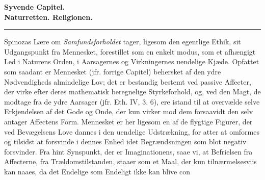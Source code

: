 \documentclass[12pt,a4paper]{book}
\begin{document}
\begin{center}
{\large\textbf{Syvende Capitel.}}\\[4pt]
\textbf{Naturretten. Religionen.}\\[6pt]
\rule{2cm}{0.4pt}
\end{center}
\bigskip
Spinozas Lære om \emph{Samfundsforholdet} tager, ligesom den egentlige Ethik, sit Udgangspunkt fra Mennesket, forestillet som en enkelt modus, som et afhængigt Led i Naturens Orden, i Aarsagernes og Virkningernes uendelige Kjæde. Opfattet som saadant er Mennesket (jfr. forrige Capitel) behersket af den ydre Nødvendigheds almindelige Lov; det er bestandig bestemt ved passive Affecter, der virke efter deres mathematisk beregnelige Styrkeforhold, og, ved den Magt, de modtage fra de ydre Aarsager (jfr. Eth. IV, 3. 6), ere istand til at overvælde selve Erkjendelsen af det Gode og Onde, der kun virker mod dem forsaavidt den selv antager Affectens Form. Mennesket er her ligesom en af de flygtige Figurer, der ved Bevægelsens Love dannes i den uendelige Udstrækning, for atter at omformes og tilsidst at forsvinde i dennes Enhed idet Begrændsningen som blot negativ forsvinder. Fra hint Synspunkt, der er Imaginationens, saae vi, at Befrielsen fra Affecterne, fra Trældomstilstanden, staaer som et Maal, der kun tilnærmelsesviis kan naaes, da det Endelige som Endeligt ikke kan blive con\-%
\end{document}
